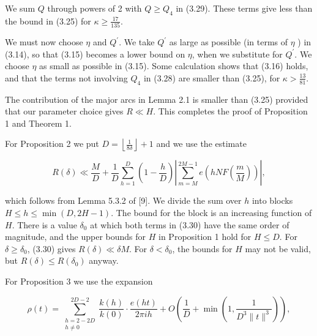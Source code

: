\documentclass[10pt]{article}
\begin{document}
We sum $Q$ through powers of 2 with $Q \geqslant Q_{4}$ in (3.29). These terms give less than the bound in (3.25) for $\kappa \geqslant \frac{17}{135}$.

We must now choose $\eta$ and $Q^{\prime}$. We take $Q^{\prime}$ as large as possible (in terms of $\eta$ ) in (3.14), so that (3.15) becomes a lower bound on $\eta$, when we substitute for $Q^{\prime}$. We choose $\eta$ as small as possible in (3.15). Some calculation shows that (3.16) holds, and that the terms not involving $Q_{4}$ in (3.28) are smaller than (3.25), for $\kappa>\frac{13}{81}$.

The contribution of the major arcs in Lemma 2.1 is smaller than (3.25) provided that our parameter choice gives $R \ll H$. This completes the proof of Proposition 1 and Theorem 1.

For Proposition 2 we put $D=\left\lfloor\frac{1}{8\delta}\right\rfloor+1$ and we use the estimate


\begin{equation*}
R(\delta) \ll \frac{M}{D}+\frac{1}{D}\sum_{h=1}^{D}\left(1-\frac{h}{D}\right) \left|\sum_{m=M}^{2 M-1} e\left(h N F\left(\frac{m}{M}\right)\right)\right|, \tag{3.30}
\end{equation*}


which follows from Lemma 5.3.2 of [9]. We divide the sum over $h$ into blocks $H \leqslant h \leqslant \min (D, 2 H-1)$. The bound for the block is an increasing function of $H$. There is a value $\delta_{0}$ at which both terms in (3.30) have the same order of magnitude, and the upper bounds for $H$ in Proposition 1 hold for $H \leqslant D$. For $\delta \geqslant \delta_{0}$, (3.30) gives $R(\delta) \ll \delta M$. For $\delta<\delta_{0}$, the bounds for $H$ may not be valid, but $R(\delta) \leqslant R\left(\delta_{0}\right)$ anyway.

For Proposition 3 we use the expansion


\begin{equation*}
\rho(t)=\sum_{\substack{h=2-2 D \\ h \neq 0}}^{2 D-2} \frac{k(h)}{k(0)} \cdot \frac{e(h t)}{2 \pi i h}+O\left(\frac{1}{D}+\min \left(1, \frac{1}{D^{3}\|t\|^{3}}\right)\right), \tag{3.31}
\end{equation*}
\end{document}

